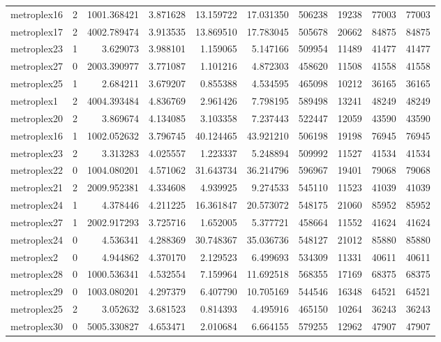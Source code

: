 \documentclass[../../../thesis.tex]{subfiles}
\begin{document}
\begin{longtable}{|l|r|r|r|r|r|r|r|r|r|}
metroplex16 & 2 & 1001.368421 & 3.871628 & 13.159722 & 17.031350 & 506238 & 19238 & 77003 & 77003 \\
metroplex17 & 2 & 4002.789474 & 3.913535 & 13.869510 & 17.783045 & 505678 & 20662 & 84875 & 84875 \\
metroplex23 & 1 & 3.629073 & 3.988101 & 1.159065 & 5.147166 & 509954 & 11489 & 41477 & 41477 \\
metroplex27 & 0 & 2003.390977 & 3.771087 & 1.101216 & 4.872303 & 458620 & 11508 & 41558 & 41558 \\
metroplex25 & 1 & 2.684211 & 3.679207 & 0.855388 & 4.534595 & 465098 & 10212 & 36165 & 36165 \\
metroplex1 & 2 & 4004.393484 & 4.836769 & 2.961426 & 7.798195 & 589498 & 13241 & 48249 & 48249 \\
metroplex20 & 2 & 3.869674 & 4.134085 & 3.103358 & 7.237443 & 522447 & 12059 & 43590 & 43590 \\
metroplex16 & 1 & 1002.052632 & 3.796745 & 40.124465 & 43.921210 & 506198 & 19198 & 76945 & 76945 \\
metroplex23 & 2 & 3.313283 & 4.025557 & 1.223337 & 5.248894 & 509992 & 11527 & 41534 & 41534 \\
metroplex22 & 0 & 1004.080201 & 4.571062 & 31.643734 & 36.214796 & 596967 & 19401 & 79068 & 79068 \\
metroplex21 & 2 & 2009.952381 & 4.334608 & 4.939925 & 9.274533 & 545110 & 11523 & 41039 & 41039 \\
metroplex24 & 1 & 4.378446 & 4.211225 & 16.361847 & 20.573072 & 548175 & 21060 & 85952 & 85952 \\
metroplex27 & 1 & 2002.917293 & 3.725716 & 1.652005 & 5.377721 & 458664 & 11552 & 41624 & 41624 \\
metroplex24 & 0 & 4.536341 & 4.288369 & 30.748367 & 35.036736 & 548127 & 21012 & 85880 & 85880 \\
metroplex2 & 0 & 4.944862 & 4.370170 & 2.129523 & 6.499693 & 534309 & 11331 & 40611 & 40611 \\
metroplex28 & 0 & 1000.536341 & 4.532554 & 7.159964 & 11.692518 & 568355 & 17169 & 68375 & 68375 \\
metroplex29 & 0 & 1003.080201 & 4.297379 & 6.407790 & 10.705169 & 544546 & 16348 & 64521 & 64521 \\
metroplex25 & 2 & 3.052632 & 3.681523 & 0.814393 & 4.495916 & 465150 & 10264 & 36243 & 36243 \\
metroplex30 & 0 & 5005.330827 & 4.653471 & 2.010684 & 6.664155 & 579255 & 12962 & 47907 & 47907 \\

\end{longtable}
\end{document}
